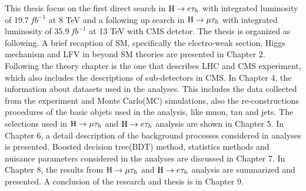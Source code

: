 This thesis focus on the first direct search in $\mathrm{H} \to e \tau_{h}$ with integrated luminosity of $19.7 ~fb^{-1}$ at 8 TeV and a following up search in $\mathrm{H}\to \mu\tau_{h}$ with integrated luminosity of $35.9~ fb^{-1}$ at 13 TeV with CMS detetor. The thesis is organized as following. A brief recaption of SM, specifically the electro-weak section, Higgs mechanism and LFV in beyond SM theories are presented in Chapter 2. Following the theory chapter is the one that describes LHC and CMS experiment, which also includes the descriptions of sub-detectors in CMS. In Chapter 4, the information about datasets used in the analyses. This includes the data collected from the experiment and Monte Carlo(MC) simulations, also the re-constructions procedures of the basic objets used in the analysis, like muon, tau and jets. The selections used in $\mathrm{H}\to \mu\tau_{h}$ and $\mathrm{H} \to e \tau_{h}$ analysis are shown in Chapter 5. In Chapter 6, a detail description of the background processes considered in analyses is presented. Boosted decision tree(BDT) method, statistics methods and nuisance parameters considered in the analyses are discussed in Chapter 7. In Chapter 8, the results from $\mathrm{H}\to \mu\tau_{h}$ and $\mathrm{H} \to e \tau_{h}$ analysis are summarized and presented. A conclusion of the research and thesis is in Chapter 9.





